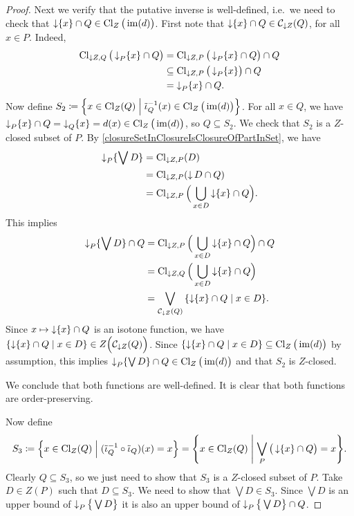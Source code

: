 \begin{proof}
Next we verify that the putative inverse is well-defined, i.e.\ we need to check that $\operatorname{\downarrow}\{x\} \cap Q \in \operatorname{Cl}_Z\big(\operatorname{im}(d)\big)$. First note that $\operatorname{\downarrow}\{x\} \cap Q \in \mathcal{C}_{\downarrow Z}(Q)$, for all $x\in P$. Indeed,
\begin{align*}
\operatorname{Cl}_{\downarrow Z,Q}\big(\operatorname{\downarrow}_P\{x\} \cap Q\big) &= \operatorname{Cl}_{\downarrow Z,P}\big(\operatorname{\downarrow}_P\{x\} \cap Q\big) \cap Q \\
&\subseteq \operatorname{Cl}_{\downarrow Z,P}\big(\operatorname{\downarrow}_P\{x\}\big) \cap Q \\
&= \operatorname{\downarrow}_P\{x\} \cap Q.
\end{align*}
Now define $S_2 \defeq \setbuilder{x\in \Closure_{Z}(Q)}{\tilde{\incl}_Q^{-1}(x) \in \Closure_Z\big(\im(d)\big)}$. For all $x\in Q$, we have $\operatorname{\downarrow}_P \{x\} \cap Q = \operatorname{\downarrow}_Q \{x\} = d(x) \in \operatorname{Cl}_Z\big(\operatorname{im}(d)\big)$, so $Q \subseteq S_2$. We check that $S_2$ is a $Z$-closed subset of $P$. By \ref{closureSetInClosureIsClosureOfPartInSet}, we have
\begin{align*}
\operatorname{\downarrow}_P\{\bigvee D\} &= \operatorname{Cl}_{\downarrow Z,P}(D) \\
&= \operatorname{Cl}_{\downarrow Z,P}(\operatorname{\downarrow} D \cap Q) \\
&= \operatorname{Cl}_{\downarrow Z,P}\Big(\bigcup_{x\in D}\operatorname{\downarrow} \{x\} \cap Q\Big).
\end{align*}
This implies
\begin{align*}
\downset_P\{\bigvee D\} \cap Q &= \Closure_{\downarrow Z,P}\Big(\bigcup_{x\in D}\downset \{x\} \cap Q\Big) \cap Q \\
&= \Closure_{\downarrow Z,Q}\Big(\bigcup_{x\in D}\downset \{x\} \cap Q\Big) \\
&= \bigvee_{\mathcal{C}_{\downarrow Z}(Q)}\setbuilder{\downset \{x\} \cap Q}{x\in D}.
\end{align*}
Since $x\mapsto \operatorname{\downarrow} \{x\} \cap Q$ is an isotone function, we have $\setbuilder{\downset \{x\} \cap Q}{x\in D} \in Z\Big(\mathcal{C}_{\downarrow Z}(Q)\Big)$. Since $\setbuilder{\downset \{x\} \cap Q}{x\in D} \subseteq \Closure_Z\big(\im(d)\big)$ by assumption, this implies $\operatorname{\downarrow}_P\{\bigvee D\} \cap Q \in \operatorname{Cl}_Z\big(\operatorname{im}(d)\big)$ and that $S_2$ is $Z$-closed.

We conclude that both functions are well-defined. It is clear that both functions are order-preserving.

Now define
\[ S_3 \defeq \setbuilder{x\in \Closure_Z(Q)}{(\tilde{\incl}_Q^{-1}\circ \tilde{\incl}_Q)(x) = x} = \setbuilder{x\in \Closure_Z(Q)}{\bigvee_P \big(\downset\{x\} \cap Q\big) = x}. \]
Clearly $Q\subseteq S_3$, so we just need to show that $S_3$ is a $Z$-closed subset of $P$. Take $D\in Z(P)$ such that $D\subseteq S_3$. We need to show that $\bigvee D \in S_3$. Since $\bigvee D$ is an upper bound of $\operatorname{\downarrow}_P\big\{\bigvee D\big\}$ it is also an upper bound of $\operatorname{\downarrow}_P\big\{\bigvee D\big\} \cap Q$. 


\end{proof}
